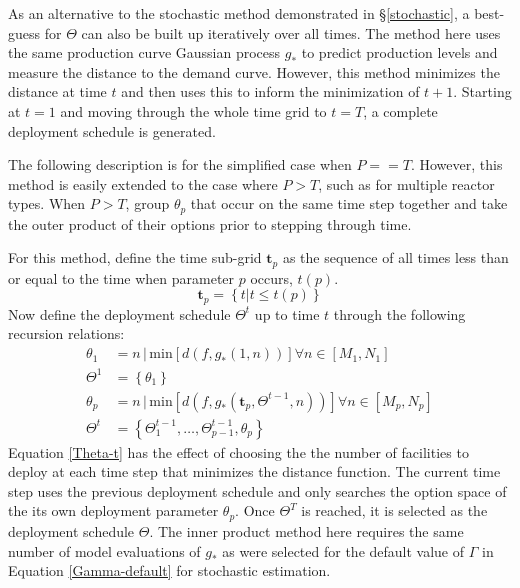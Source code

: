 As an alternative to the stochastic method demonstrated in \S\ref{stochastic}, 
a best-guess for $\Theta$ can also be built up iteratively over all times.
The method here uses the same production curve Gaussian process $g_*$ to 
predict production levels and measure the distance to the demand curve.
However, this method minimizes the distance at time
$t$ and then uses this to inform the minimization of $t+1$. Starting at $t=1$
and moving through the whole time grid to $t=T$, a complete deployment 
schedule is generated.

The following description is for the simplified case when $P==T$. However, 
this method is easily extended to the case where $P > T$, such as for 
multiple reactor types.  When $P > T$, group $\theta_p$ that occur on the 
same time step together and take the outer product of their options prior to
stepping through time.

For this method, define the time sub-grid $\mathbf{t}_p$ as the sequence of
all times less than or equal to the time when parameter $p$ occurs, $t(p)$.
\begin{equation}
\label{t-p}
\mathbf{t}_p = \left\{t | t \le t(p)\right\}
\end{equation}
Now define the deployment schedule $\Theta^t$ up to time $t$ through the
following recursion relations:
\begin{equation}
\label{Theta-t}
\begin{split}
\theta_1 & = n \, | \, \mathrm{min}\left[d(f, g_*(1, n))\right]
                       \forall n\in[M_1, N_1] \\
\Theta^1 & = \left\{\theta_1\right\}\\
\theta_p & = n \, | \, \mathrm{min}\left[d(f, g_*(\mathbf{t}_p, 
                                                  \Theta^{t-1}, n))\right]
                       \forall n\in[M_p, N_p] \\
\Theta^t & = \left\{\Theta_1^{t-1}, \ldots, \Theta_{p-1}^{t-1}, \theta_p\right\}
\end{split}
\end{equation}
Equation \ref{Theta-t} has the effect of choosing the the number of 
facilities to deploy at each time step that minimizes the distance function.
The current time step uses the previous deployment schedule and only searches
the option space of the its own deployment parameter $\theta_p$. 
Once $\Theta^T$ is 
reached, it is selected as the deployment schedule $\Theta$. The inner 
product method here requires the same number of model evaluations of $g_*$ as 
were selected for the default value of $\Gamma$ in Equation 
\ref{Gamma-default} for stochastic estimation.



